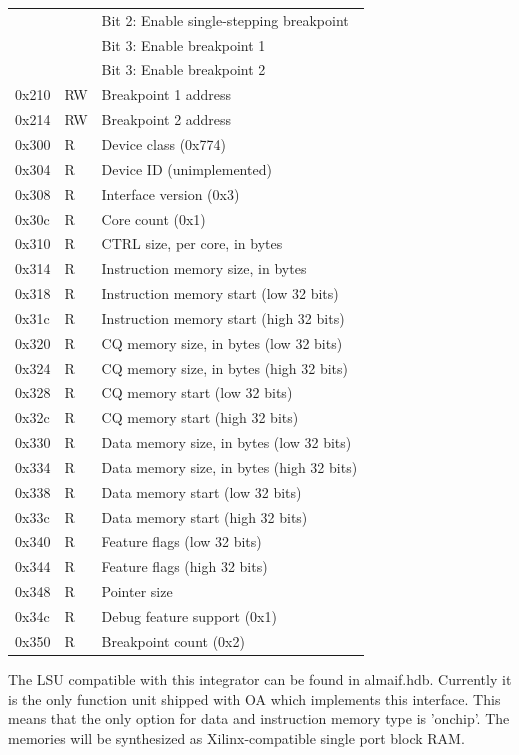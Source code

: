 \documentclass[a4paper,twoside]{tceusermanual}
\begin{document}
\begin{table}[h!]
\begin{center}
\begin{tabular}{lll}
          &    & Bit 2: Enable single-stepping breakpoint \\
          &    & Bit 3: Enable breakpoint 1 \\
          &    & Bit 3: Enable breakpoint 2 \\
    0x210 & RW & Breakpoint 1 address \\
    0x214 & RW & Breakpoint 2 address \\
    \hline
    0x300 & R & Device class (0x774) \\
    0x304 & R & Device ID (unimplemented) \\
    0x308 & R & Interface version (0x3) \\
    0x30c & R & Core count (0x1) \\
    0x310 & R & CTRL size, per core, in bytes \\
    0x314 & R & Instruction memory size, in bytes \\
    0x318 & R & Instruction memory start (low 32 bits) \\
    0x31c & R & Instruction memory start (high 32 bits) \\
    0x320 & R & CQ memory size, in bytes (low 32 bits) \\
    0x324 & R & CQ memory size, in bytes (high 32 bits) \\
    0x328 & R & CQ memory start (low 32 bits) \\
    0x32c & R & CQ memory start (high 32 bits) \\
    0x330 & R & Data memory size, in bytes (low 32 bits)  \\
    0x334 & R & Data memory size, in bytes (high 32 bits)  \\
    0x338 & R & Data memory start (low 32 bits) \\
    0x33c & R & Data memory start (high 32 bits) \\
    0x340 & R & Feature flags (low 32 bits) \\
    0x344 & R & Feature flags (high 32 bits) \\
    0x348 & R & Pointer size \\
    0x34c & R & Debug feature support (0x1) \\
    0x350 & R & Breakpoint count (0x2) \\
    \end{tabular}
  \end{center}
\end{table}


The LSU compatible with this integrator can be found in almaif.hdb. Currently
it is the only function unit shipped with OA which implements this interface.
This means that the only option for data and instruction memory type is
'onchip'. The memories will be synthesized as Xilinx-compatible single port
block RAM.
\end{document}
